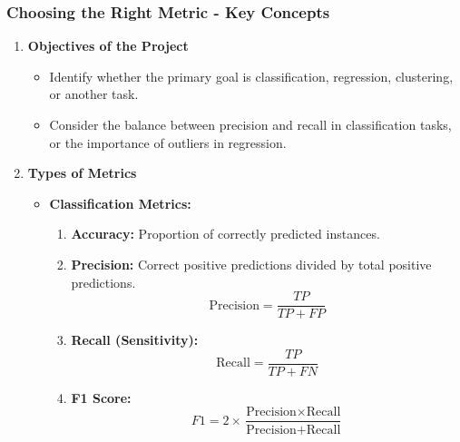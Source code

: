 \documentclass{beamer}
\begin{document}
\begin{frame}[fragile]
    \frametitle{Choosing the Right Metric - Key Concepts}
    \begin{enumerate}
        \item \textbf{Objectives of the Project}
            \begin{itemize}
                \item Identify whether the primary goal is classification, regression, clustering, or another task.
                \item Consider the balance between precision and recall in classification tasks, or the importance of outliers in regression.
            \end{itemize}

        \item \textbf{Types of Metrics}
            \begin{itemize}
                \item \textbf{Classification Metrics:}
                    \begin{enumerate}
                        \item \textbf{Accuracy:} Proportion of correctly predicted instances.
                        \item \textbf{Precision:} Correct positive predictions divided by total positive predictions.
                            \begin{equation}
                                \text{Precision} = \frac{TP}{TP + FP}
                            \end{equation}
                        \item \textbf{Recall (Sensitivity):}
                            \begin{equation}
                                \text{Recall} = \frac{TP}{TP + FN}
                            \end{equation}
                        \item \textbf{F1 Score:}
                            \begin{equation}
                                F1 = 2 \times \frac{\text{Precision} \times \text{Recall}}{\text{Precision} + \text{Recall}}
                            \end{equation}
                    \end{enumerate}
                

\end{itemize}
\end{enumerate}
\end{frame}
\end{document}
